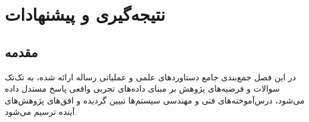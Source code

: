 \documentclass[12pt,a4paper]{report}
\theoremstyle{definition}
\begin{document}




\chapter{نتیجه‌گیری و پیشنهادات}
\label{chap:conclusion}

\section{مقدمه}
در این فصل جمع‌بندی جامع دستاوردهای علمی و عملیاتی رساله ارائه شده، به تک‌تک سوالات و فرضیه‌های پژوهش بر مبنای داده‌های تجربی واقعی پاسخ مستدل داده می‌شود، درس‌آموخته‌های فنی و مهندسی سیستم‌ها تبیین گردیده و افق‌های پژوهش‌های آینده ترسیم می‌شود.
\end{document}
